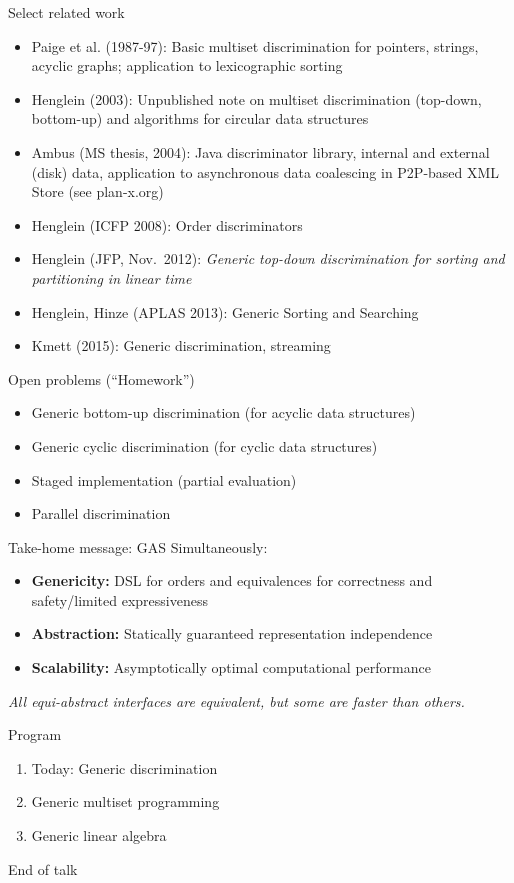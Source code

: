 \documentclass{beamer}
\begin{document}
\begin{frame}{Select related work}
  \begin{itemize}
  \item Paige et al. (1987-97): Basic multiset discrimination for pointers,
    strings, acyclic graphs; application to lexicographic sorting
  \item Henglein (2003): Unpublished note on multiset discrimination
    (top-down, bottom-up) and algorithms for circular data structures
  \item Ambus (MS thesis, 2004): Java discriminator library, internal and
    external (disk) data, application to asynchronous data coalescing in
    P2P-based XML Store (see plan-x.org)
  \item Henglein (ICFP 2008): Order discriminators
  \item Henglein (JFP, Nov.\ 2012): \emph{Generic top-down discrimination
      for sorting and partitioning in linear time}
  \item Henglein, Hinze (APLAS 2013): Generic Sorting and Searching
  \item Kmett (2015): Generic discrimination, streaming
  \end{itemize}
\end{frame}

\begin{frame}{Open problems (``Homework'')}
  \begin{itemize}
  \item Generic bottom-up discrimination (for acyclic data structures)
  \item Generic cyclic discrimination (for cyclic data structures)
  \item Staged implementation (partial evaluation)
  \item Parallel discrimination
  \end{itemize}
\end{frame}

\begin{frame}{Take-home message: GAS}
  Simultaneously:
  \begin{itemize}
  \item \textbf{Genericity:} DSL for orders and equivalences for correctness
    and safety/limited expressiveness
  \item \textbf{Abstraction:} Statically guaranteed representation
    independence
  \item \textbf{Scalability:} Asymptotically optimal computational
    performance
  \end{itemize}
  \emph{All equi-abstract interfaces are equivalent, but some are faster than
    others.}
\end{frame}

\begin{frame}{Program}
  \begin{enumerate}
  \item Today: Generic discrimination
  \item Generic multiset programming
  \item Generic linear algebra
  \end{enumerate}
  \vspace{1cm}
  \begin{center}
    End of talk
  \end{center}
\end{frame}
\end{document}
